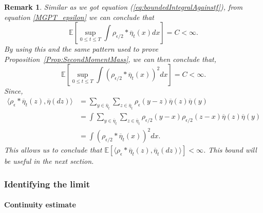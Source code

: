 \documentclass[12pt]{article}
\newtheorem{remark}[theorem]{Remark}
\newcommand{\IE}{\mathbb E}
\begin{document}
\begin{remark} \label{remark:BoundedIntegral}
Similar as we got equation (\ref{eq:boundedIntegralAgainstf}), from equation \ref{MGPT_epsilon} we can conclude that
\[ \IE\left[\sup_{0 \leq t \leq T} \int \rho_{\epsilon/2} * \overline{\eta}_t(x) dx \right] = C < \infty. \]
By using this and the same pattern used to prove Proposition~\ref{Prop:SecondMomentMass}, we can then conclude that,
\[ \IE\left[  \sup_{0 \leq t \leq T} \int \left(\rho_{\epsilon/2} * \overline{\eta}_t(x) \right)^2 dx \right] = C < \infty. \]
Since,
\begin{align*}
\langle \rho_\epsilon * \overline{\eta}_t(z), \overline{\eta}(dz) \rangle & = \sum_{y \in \overline{\eta}_t} \sum_{z \in \overline{\eta}_t} \rho_\epsilon(y-z) \overline{\eta}(z) \overline{\eta}(y) \\ &= \int  \sum_{y \in \overline{\eta}_t} \sum_{z \in \overline{\eta}_t} \rho_{\epsilon/2}(y-x) \rho_{\epsilon/2}(z-x) \overline{\eta}(z) \overline{\eta}(y) \\ &= \int (\rho_{\epsilon/2}*\overline{\eta}_t(x))^2 dx.
\end{align*}
This allows us to conclude that $\IE[\langle \rho_\epsilon*\overline{\eta}_t(z),\overline{\eta}_t(dz) \rangle ] < \infty$. This bound will be useful in the next section.
\end{remark}

\subsubsection{Identifying the limit}

\paragraph{Continuity estimate}
\end{document}
